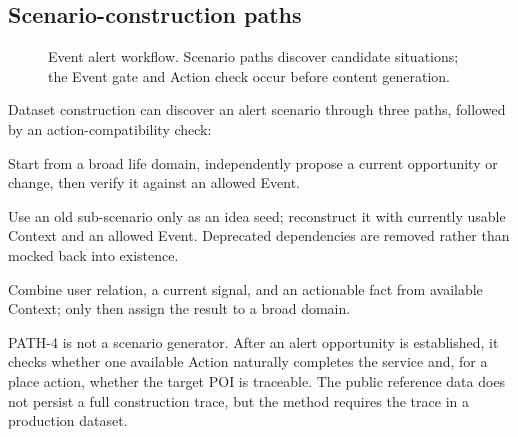 \documentclass[10pt]{article}
\begin{document}
\subsection{Scenario-construction paths}

\begin{figure}[t]
\centering
{}
\caption{Event alert workflow. Scenario paths discover candidate situations; the Event gate and Action check occur before content generation.}
\label{fig:event-workflow}
\end{figure}

Dataset construction can discover an alert scenario through three paths, followed by an action-compatibility check:
\begin{description}[leftmargin=3.2cm,labelwidth=2.9cm]
  \item[PATH-1 (top-down)] Start from a broad life domain, independently propose a current opportunity or change, then verify it against an allowed Event.
  \item[PATH-2 (seeded expansion)] Use an old sub-scenario only as an idea seed; reconstruct it with currently usable Context and an allowed Event. Deprecated dependencies are removed rather than mocked back into existence.
  \item[PATH-3 (bottom-up)] Combine user relation, a current signal, and an actionable fact from available Context; only then assign the result to a broad domain.
\end{description}
PATH-4 is not a scenario generator. After an alert opportunity is established, it checks whether one available Action naturally completes the service and, for a place action, whether the target POI is traceable. The public reference data does not persist a full construction trace, but the method requires the trace in a production dataset.
\end{document}
